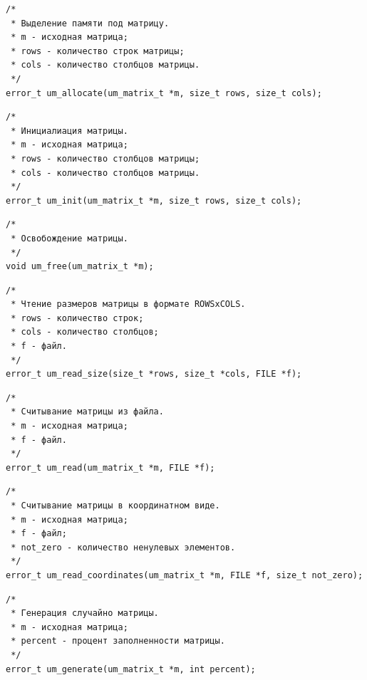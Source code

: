 \documentclass[a4paper,12pt]{extarticle}
\begin{document}
 \vspace{0.5cm}

\begin{verbatim}
/*
 * Выделение памяти под матрицу.
 * m - исходная матрица;
 * rows - количество строк матрицы;
 * cols - количество столбцов матрицы.
 */
error_t um_allocate(um_matrix_t *m, size_t rows, size_t cols);
\end{verbatim}


 \vspace{0.5cm}

\begin{verbatim}
/*
 * Инициалиация матрицы.
 * m - исходная матрица;
 * rows - количество столбцов матрицы;
 * cols - количество столбцов матрицы.
 */
error_t um_init(um_matrix_t *m, size_t rows, size_t cols);
\end{verbatim}


 \vspace{0.5cm}

\begin{verbatim}
/*
 * Освобождение матрицы.
 */
void um_free(um_matrix_t *m);
\end{verbatim}


 \vspace{0.5cm}

\begin{verbatim}
/*
 * Чтение размеров матрицы в формате ROWSxCOLS.
 * rows - количество строк;
 * cols - количество столбцов;
 * f - файл.
 */
error_t um_read_size(size_t *rows, size_t *cols, FILE *f);
\end{verbatim}


 \vspace{0.5cm}

\begin{verbatim}
/*
 * Считывание матрицы из файла.
 * m - исходная матрица;
 * f - файл.
 */
error_t um_read(um_matrix_t *m, FILE *f);
\end{verbatim}


 \vspace{0.5cm}

\begin{verbatim}
/*
 * Считывание матрицы в координатном виде.
 * m - исходная матрица;
 * f - файл;
 * not_zero - количество ненулевых элементов.
 */
error_t um_read_coordinates(um_matrix_t *m, FILE *f, size_t not_zero);
\end{verbatim}


 \vspace{0.5cm}

\begin{verbatim}
/*
 * Генерация случайно матрицы.
 * m - исходная матрица;
 * percent - процент заполненности матрицы.
 */
error_t um_generate(um_matrix_t *m, int percent);
\end{verbatim}
\end{document}
